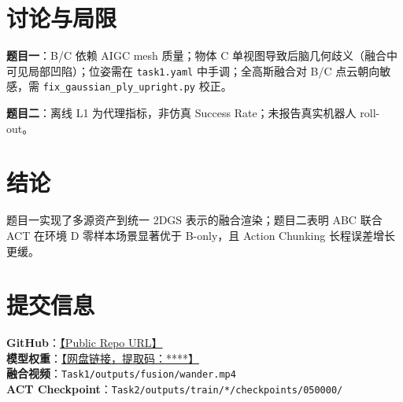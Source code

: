 \documentclass[10pt,twocolumn,letterpaper]{article}
\begin{document}
\section{讨论与局限}
\label{sec:discussion}

\textbf{题目一}：B/C 依赖 AIGC mesh 质量；物体 C 单视图导致后脑几何歧义（融合中可见局部凹陷）；位姿需在 \texttt{task1.yaml} 中手调；全高斯融合对 B/C 点云朝向敏感，需 \texttt{fix\_gaussian\_ply\_upright.py} 校正。

\textbf{题目二}：离线 L1 为代理指标，非仿真 Success Rate；未报告真实机器人 roll-out。

\section{结论}
\label{sec:conclusion}

题目一实现了多源资产到统一 2DGS 表示的融合渲染；题目二表明 ABC 联合 ACT 在环境 D 零样本场景显著优于 B-only，且 Action Chunking 长程误差增长更缓。

\section*{提交信息}
\noindent
\textbf{GitHub}：\url{【Public Repo URL】}\\
\textbf{模型权重}：\url{【网盘链接，提取码：****】}\\
\textbf{融合视频}：\texttt{Task1/outputs/fusion/wander.mp4}\\
\textbf{ACT Checkpoint}：\texttt{Task2/outputs/train/*/checkpoints/050000/}

{\small


}
\end{document}
